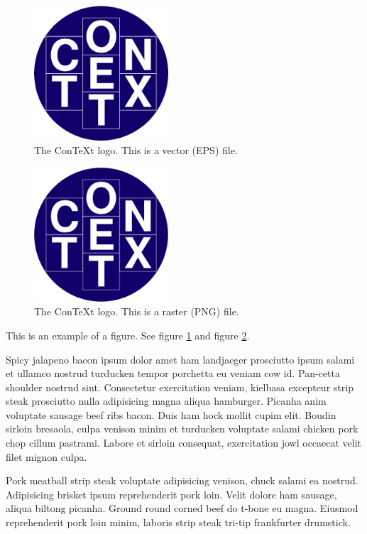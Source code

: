 \documentclass{article}
\begin{document}
\begin{figure}
  \centering
  \includegraphics[width=5cm]{./ConTeXt_Unofficial_Logo.eps}
  \caption{The ConTeXt logo. This is a vector (EPS) file.}
  \label{fig-vector}
\end{figure}

\begin{figure}
  \centering
  \includegraphics[width=5cm]{./ConTeXt_Unofficial_Logo.png}
  \caption{The ConTeXt logo. This is a raster (PNG) file.}
  \label{fig-raster}
\end{figure}

This is an example of a figure. See figure \ref{fig-vector} and figure \ref{fig-raster}.

 Spicy jalapeno bacon ipsum dolor amet ham landjaeger prosciutto ipsum salami et ullamco nostrud turducken tempor porchetta eu veniam cow id. Pan-cetta shoulder nostrud sint. Consectetur exercitation veniam, kielbasa excepteur strip steak prosciutto nulla adipisicing magna aliqua hamburger. Picanha anim voluptate sausage beef ribs bacon. Duis ham hock mollit cupim elit. Boudin sirloin bresaola, culpa venison minim et turducken voluptate salami chicken pork chop cillum pastrami. Labore et sirloin consequat, exercitation jowl occaecat velit filet mignon culpa.

 Pork meatball strip steak voluptate adipisicing venison, chuck salami ea nostrud. Adipisicing brisket ipsum reprehenderit pork loin. Velit dolore ham sausage, aliqua biltong picanha. Ground round corned beef do t-bone eu magna. Eiusmod reprehenderit pork loin minim, laboris strip steak tri-tip frankfurter drumstick.
\end{document}
